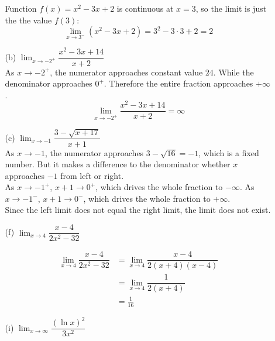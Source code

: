 \documentclass{article}
\begin{document}
\begin{enumerate}
\begin{enumerate}
            Function $f(x) = x^2-3x+2$ is continuous at $x = 3$, so the limit is just the the value $f(3)$:
            $$ \lim_{x \rightarrow 3^{-}} (x^2-3x+2) = 3^2 -3 \cdot 3 + 2 = 2 $$
            
            \item[(b)] $ \lim_{x \rightarrow -2^{+}} \dfrac{x^2-3x+14}{x+2} $\\
            
            As $x \rightarrow -2^{+}$, the numerator approaches constant value $24$. While the denominator approaches $0^{+}$. Therefore the entire fraction approaches $+\infty$.
            $$ \lim_{x \rightarrow -2^{+}} \dfrac{x^2-3x+14}{x+2} = \infty $$
            
            \item[(c)] $ \lim_{x \rightarrow -1} \dfrac{3-\sqrt{x+17}}{x+1} $\\
            
            As $x \rightarrow -1$, the numerator approaches $3-\sqrt{16}=-1$, which is a fixed number. But it makes a difference to the denominator whether $x$ approaches $-1$ from left or right.\\
            
            As $x \rightarrow -1^{+}$, $x+1 \rightarrow 0^{+}$, which drives the whole fraction to $-\infty$. 
            As $x \rightarrow -1^{-}$, $x+1 \rightarrow 0^{-}$, which drives the whole fraction to $+\infty$. \\
            
            Since the left limit does not equal the right limit, the limit does not exist.
            
            \item[(f)] $ \lim_{x \rightarrow 4} \dfrac{x-4}{2x^2-32} $
            
            \begin{equation*}
            \begin{aligned}
                \lim_{x \rightarrow 4} \dfrac{x-4}{2x^2-32} 
                &= \lim_{x \rightarrow 4} \dfrac{x-4}{2(x+4)(x-4)} \\
                &= \lim_{x \rightarrow 4} \dfrac{1}{2(x+4)} \\
                &= \frac{1}{16}
            \end{aligned}
            \end{equation*}
            
            \item[(i)] $ \lim_{x \rightarrow \infty} \dfrac{(\ln{x})^2}{3x^2} $
            

\end{enumerate}
\end{enumerate}
\end{document}
